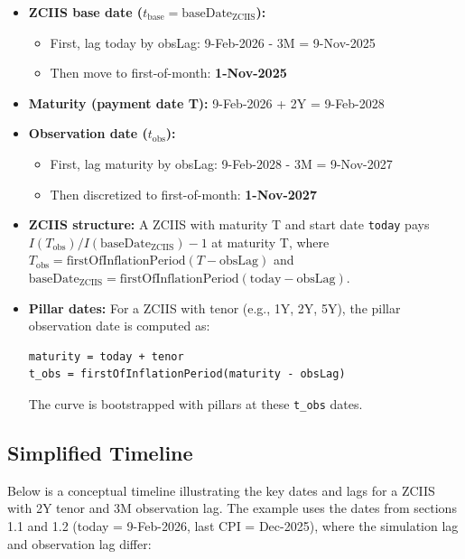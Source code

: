 \documentclass[11pt,a4paper]{article}
\newcommand{\code}[1]{\texttt{#1}}
\begin{document}
\begin{itemize}[leftmargin=*]
\item \textbf{ZCIIS base date ($t_\text{base} = \text{baseDate}_{\text{ZCIIS}}$):}
    \begin{itemize}
    \item First, lag today by obsLag: 9-Feb-2026 - 3M = 9-Nov-2025
    \item Then move to first-of-month: \textbf{1-Nov-2025}
    \end{itemize}

\item \textbf{Maturity (payment date T):} 9-Feb-2026 + 2Y = 9-Feb-2028

\item \textbf{Observation date ($t_\text{obs}$):}
    \begin{itemize}
    \item First, lag maturity by obsLag: 9-Feb-2028 - 3M = 9-Nov-2027
    \item Then discretized to first-of-month: \textbf{1-Nov-2027}
    \end{itemize}

\item \textbf{ZCIIS structure:} A ZCIIS with maturity T and start date \code{today} pays $I(T_{\text{obs}}) / I(\text{baseDate}_{\text{ZCIIS}}) - 1$ at maturity T, where $T_{\text{obs}} = \text{firstOfInflationPeriod}(T - \text{obsLag})$ and $\text{baseDate}_{\text{ZCIIS}} = \text{firstOfInflationPeriod}(\text{today} - \text{obsLag})$.

\item \textbf{Pillar dates:} For a ZCIIS with tenor (e.g., 1Y, 2Y, 5Y), the pillar observation date is computed as:
\begin{lstlisting}
maturity = today + tenor
t_obs = firstOfInflationPeriod(maturity - obsLag)
\end{lstlisting}
The curve is bootstrapped with pillars at these \code{t\_obs} dates.
\end{itemize}

\subsection{Simplified Timeline}

Below is a conceptual timeline illustrating the key dates and lags for a ZCIIS with 2Y tenor and 3M observation lag. The example uses the dates from sections 1.1 and 1.2 (today = 9-Feb-2026, last CPI = Dec-2025), where the simulation lag and observation lag differ:
\end{document}
